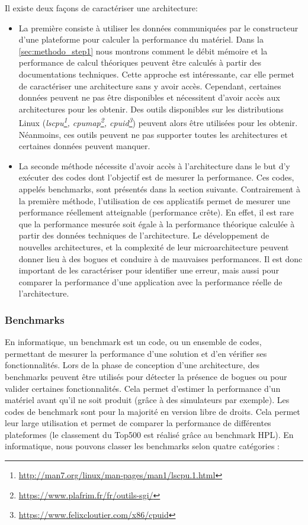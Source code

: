     Il existe deux façons de caractériser une architecture: 
    \begin{itemize}
        \item La première consiste à utiliser les données communiquées par le constructeur d'une plateforme pour calculer la performance du matériel. Dans la \autoref{sec:methodo_step1} nous montrons comment le débit mémoire et la performance de calcul théoriques peuvent être calculés à partir des documentations techniques. Cette approche est intéressante, car elle permet de caractériser une architecture sans y avoir accès. Cependant, certaines données peuvent ne pas être disponibles et nécessitent d'avoir accès aux architectures pour les obtenir. Des outils disponibles sur les distributions Linux (\textit{lscpu\footnote{\url{http://man7.org/linux/man-pages/man1/lscpu.1.html}}, cpumap\footnote{\url{https://www.plafrim.fr/fr/outils-sgi/}}, cpuid\footnote{\url{https://www.felixcloutier.com/x86/cpuid}}}) peuvent alors être utilisées pour les obtenir. Néanmoins, ces outils peuvent ne pas supporter toutes les architectures et certaines données peuvent manquer.
    
        \item La seconde méthode nécessite d'avoir accès à l'architecture dans le but d'y exécuter des codes dont l'objectif est de mesurer la performance. Ces codes, appelés \glspl{benchmark}, sont présentés dans la section suivante. Contrairement à la première méthode, l'utilisation de ces applicatifs permet de mesurer une performance réellement atteignable (performance crête). En effet, il est rare que la performance mesurée soit égale à la performance théorique calculée à partir des données techniques de l'architecture. Le développement de nouvelles architectures, et la complexité de leur microarchitecture peuvent donner lieu à des bogues et conduire à de mauvaises performances. Il est donc important de les caractériser pour identifier une erreur, mais aussi pour comparer la performance d'une application avec la performance réelle de l'architecture.
    \end{itemize}
    
           
    \subsubsection{Benchmarks}
           
        En informatique, un \gls{benchmark} est un code, ou un ensemble de codes, permettant de mesurer la performance d'une solution et d'en vérifier ses fonctionnalités. Lors de la phase de conception d'une architecture, des benchmarks peuvent être utilisés pour détecter la présence de bogues ou pour valider certaines fonctionnalités. Cela permet d'estimer la performance d'un matériel avant qu'il ne soit produit (grâce à des simulateurs par exemple). Les codes de benchmark sont pour la majorité en version libre de droits. Cela permet leur large utilisation et permet de comparer la performance de différentes plateformes (le classement du Top500 est réalisé grâce au benchmark HPL). En informatique, nous pouvons classer les benchmarks selon quatre catégories \cite{Staelin2004}:
        
